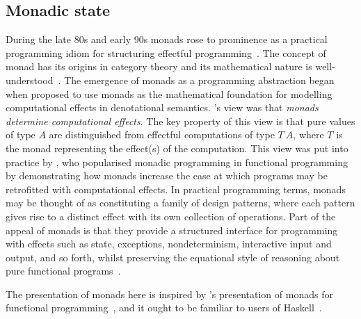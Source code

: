 \documentclass[12pt,phd,lfcs,twoside,openright,logo,leftchapter,normalheadings]{infthesis}
\theoremstyle{plain}
\theoremstyle{definition}
\begin{document}
\subsection{Monadic state}
During the late 80s and early 90s monads rose to prominence as a
practical programming idiom for structuring effectful
programming~\cite{Moggi89,Moggi91,Wadler92,Wadler92b,JonesW93,Wadler95,JonesABBBFHHHHJJLMPRRW99}.
%
The concept of monad has its origins in category theory and its
mathematical nature is well-understood~\cite{MacLane71,Borceux94}. The
emergence of monads as a programming abstraction began when
\citet{Moggi89,Moggi91} proposed to use monads as the mathematical
foundation for modelling computational effects in denotational
semantics. \citeauthor{Moggi91}'s view was that \emph{monads determine
  computational effects}. The key property of this view is that pure
values of type $A$ are distinguished from effectful computations of
type $T~A$, where $T$ is the monad representing the effect(s) of the
computation. This view was put into practice by
\citet{Wadler92,Wadler95}, who popularised monadic programming in
functional programming by demonstrating how monads increase the ease
at which programs may be retrofitted with computational effects.
%
In practical programming terms, monads may be thought of as
constituting a family of design patterns, where each pattern gives
rise to a distinct effect with its own collection of operations.
%
Part of the appeal of monads is that they provide a structured
interface for programming with effects such as state, exceptions,
nondeterminism, interactive input and output, and so forth, whilst
preserving the equational style of reasoning about pure functional
programs~\cite{GibbonsH11,Gibbons12}.
%
%

The presentation of monads here is inspired by \citeauthor{Wadler92}'s
presentation of monads for functional programming~\cite{Wadler92}, and
it ought to be familiar to users of
Haskell~\cite{JonesABBBFHHHHJJLMPRRW99}.
\end{document}
